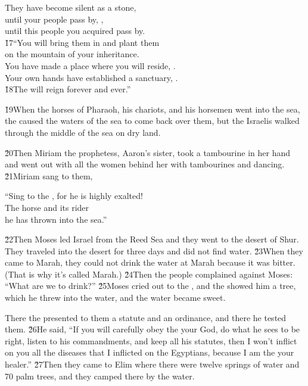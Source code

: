 \begin{poetry}
\poeml They have become silent as a stone, \\
\poemll    until your people pass by, , \\
\poemlll       until this people you acquired pass by. \\
\poeml \v{17}``You will bring them in and plant them \\
\poemll    on the mountain of your inheritance. \\
\poeml You have made a place where you will reside, . \\
\poemll    Your own hands have established a sanctuary, . \\
\poeml \v{18}The  will reign forever and ever.''
\end{poetry}

\v{19}When the horses of Pharaoh, his chariots, and his horsemen went into the sea, the  caused the waters of the sea to come back over them, but the Israelis walked through the middle of the sea on dry land.

\v{20}Then Miriam the prophetess, Aaron's sister, took a tambourine in her hand and went out with all the women behind her with tambourines and dancing. \v{21}Miriam sang to them,

\begin{poetry}
\poeml ``Sing to the , for he is highly exalted! \\
\poemll    The horse and its rider \\
\poemlll       he has thrown into the sea.''
\end{poetry}

\v{22}Then Moses led Israel from the Reed Sea and they went to the desert of Shur. They traveled into the desert for three days and did not find water. \v{23}When they came to Marah, they could not drink the water at Marah because it was bitter. (That is why it's called Marah.) \v{24}Then the people complained against Moses: ``What are we to drink?'' \v{25}Moses cried out to the , and the  showed him a tree, which he threw into the water, and the water became sweet.

There the  presented to them a statute and an ordinance, and there he tested them. \v{26}He said, ``If you will carefully obey the  your God, do what he sees to be right, listen to his commandments, and keep all his statutes, then I won't inflict on you all the diseases that I inflicted on the Egyptians, because I am the  your healer.'' \v{27}Then they came to Elim where there were twelve springs of water and 70 palm trees, and they camped there by the water.

